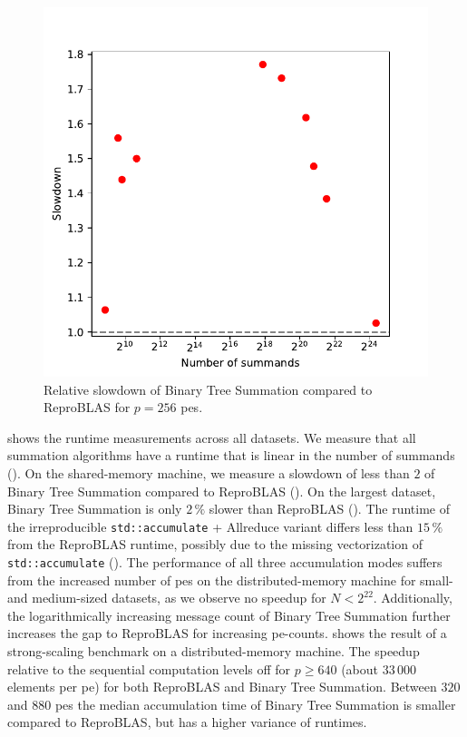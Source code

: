 \begin{figure}
\centering
\includegraphics[scale=0.75]{figures/slowdownPlot.pdf}
\caption{Relative slowdown of Binary Tree Summation compared to ReproBLAS for $p=256$ \glspl{pe}.}
\label{fig:slowdownPlot}
\end{figure}

 shows the runtime measurements across all datasets.
We measure that all summation algorithms have a runtime that is linear in the number of summands ().
On the shared-memory machine, we measure a slowdown of less than $2$ of Binary Tree Summation compared to ReproBLAS ().
On the largest dataset, Binary Tree Summation is only $2\,\%$ slower than ReproBLAS ().
The runtime of the irreproducible \texttt{std::accumulate} + Allreduce variant differs less than $15\,\%$ from the ReproBLAS runtime, possibly due to the missing vectorization of \texttt{std::accumulate} ().
The performance of all three accumulation modes suffers from the increased number of \glspl{pe} on the distributed-memory machine for small- and medium-sized datasets, as we observe no speedup for $N < 2^{22}$.
Additionally, the logarithmically increasing message count of Binary Tree Summation further increases the gap to ReproBLAS for increasing \gls{pe}-counts.\@
{} shows the result of a strong-scaling benchmark on a distributed-memory machine.
The speedup relative to the sequential computation levels off for $p \geq 640$ (about $33\,000$ elements per \gls{pe}) for both ReproBLAS and Binary Tree Summation.
Between $320$ and $880$ \glspl{pe} the median accumulation time of Binary Tree Summation is smaller compared to ReproBLAS, but has a higher variance of runtimes.


